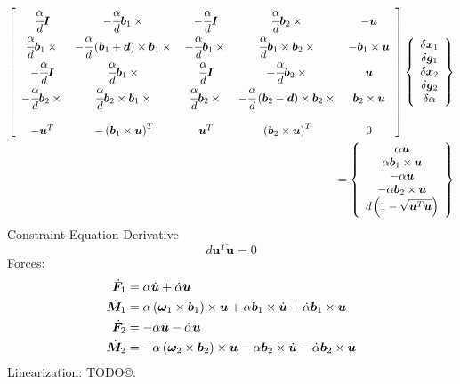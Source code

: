 \documentclass[10pt,fleqn,subeqn]{report}
\newcommand{\T}[1]{\bm{#1}}
\begin{document}
\begin{align}
	\sqbr{\matr{ccccc}{
		\cfrac{\alpha}{d}\T{I} & -\cfrac{\alpha}{d}\T{b}_1\times{} &
			-\cfrac{\alpha}{d}\T{I} & \cfrac{\alpha}{d}\T{b}_2\times{} & -\T{u} \\
		\cfrac{\alpha}{d}\T{b}_1\times{} & 
			-\cfrac{\alpha}{d}\plbr{\T{b}_1 + \T{d}}\times\T{b}_1\times{} &
			-\cfrac{\alpha}{d}\T{b}_1\times{} & 
			\cfrac{\alpha}{d}\T{b}_1\times\T{b}_2\times{} & 
			-\T{b}_1\times\T{u} \\
		-\cfrac{\alpha}{d}\T{I} & \cfrac{\alpha}{d}\T{b}_1\times{} &
			\cfrac{\alpha}{d}\T{I} & -\cfrac{\alpha}{d}\T{b}_2\times{} & \T{u} \\
		-\cfrac{\alpha}{d}\T{b}_2\times{} &
			\cfrac{\alpha}{d}\T{b}_2\times\T{b}_1\times{} &
			\cfrac{\alpha}{d}\T{b}_2\times{} &
			- \cfrac{\alpha}{d}\plbr{\T{b}_2 - \T{d}}\times{\T{b}_2\times{}} &
			\T{b}_2\times\T{u} \\
		\\
		-\T{u}^T & - \plbr{\T{b}_1\times\T{u}}^T & 
			\T{u}^T & \plbr{\T{b}_2\times\T{u}}^T & 0
	}}\cubr{\cvvect{
		\delta\T{x}_1 \\
		\delta\T{g}_1 \\
		\delta\T{x}_2 \\
		\delta\T{g}_2 \\
		\delta\alpha
	}} & \nonumber \\
	\mbox{} = \cubr{\cvvect{
		\alpha \T{u} \\
		\alpha \T{b}_1\times\T{u} \\
		-\alpha \T{u} \\
		-\alpha \T{b}_2\times\T{u} \\
		d\plbr{1 - \sqrt{\T{u}^T \T{u}}}
	}} &
\end{align}
Constraint Equation Derivative
\begin{equation}
	d \T{u}^T\dot{\T{u}} = 0
\end{equation}
Forces:
\begin{subequations}
\begin{align}
	\dot{\T{F}}_1 &= \alpha \dot{\T{u}} + \dot{\alpha} \T{u} \\
	\dot{\T{M}}_1 &= \alpha \plbr{\T{\omega}_1\times\T{b}_1} \times \T{u} 
		+ \alpha \T{b}_1 \times \dot{\T{u}}
		+ \dot{\alpha} \T{b}_1 \times \T{u} \\
	\dot{\T{F}}_2 &= -\alpha \dot{\T{u}} - \dot{\alpha} \T{u} \\
	\dot{\T{M}}_2 &= -\alpha \plbr{\T{\omega}_2 \times\T{b}_2} \times \T{u}
		- \alpha \T{b}_2 \times \dot{\T{u}}
		- \dot{\alpha} \T{b}_2 \times \T{u}
\end{align}
\end{subequations}
Linearization: TODO\copyright.
\end{document}
